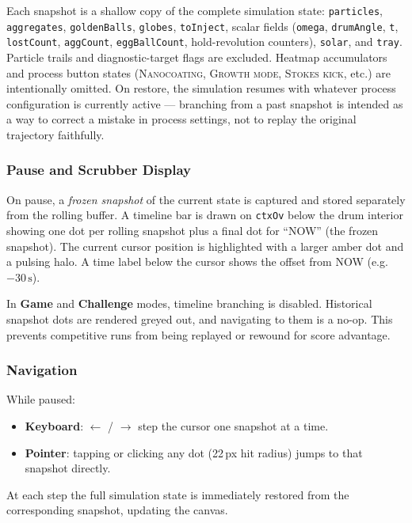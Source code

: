 \documentclass[12pt, a4paper]{article}
\begin{document}
Each snapshot is a shallow copy of the complete simulation state:
\texttt{particles}, \texttt{aggregates}, \texttt{goldenBalls},
\texttt{globes}, \texttt{toInject}, scalar fields (\texttt{omega},
\texttt{drumAngle}, \texttt{t}, \texttt{lostCount}, \texttt{aggCount},
\texttt{eggBallCount}, hold-revolution counters), \texttt{solar}, and
\texttt{tray}. Particle trails and diagnostic-target flags are excluded.
Heatmap accumulators and process button states (\textsc{Nanocoating},
\textsc{Growth mode}, \textsc{Stokes kick}, etc.) are intentionally omitted.
On restore, the simulation resumes with whatever process configuration is
currently active --- branching from a past snapshot is intended as a way to
correct a mistake in process settings, not to replay the original trajectory
faithfully.

\subsubsection{Pause and Scrubber Display}

On pause, a \emph{frozen snapshot} of the current state is captured and stored
separately from the rolling buffer. A timeline bar is drawn on
\texttt{ctxOv} below the drum interior showing one dot per rolling snapshot
plus a final dot for ``NOW'' (the frozen snapshot). The current cursor
position is highlighted with a larger amber dot and a pulsing halo. A time
label below the cursor shows the offset from NOW (e.g.\ $-30\,\mathrm{s}$).

In \textbf{Game} and \textbf{Challenge} modes, timeline branching is
disabled. Historical snapshot dots are rendered greyed out, and navigating to
them is a no-op. This prevents competitive runs from being replayed or
rewound for score advantage.

\subsubsection{Navigation}

While paused:
\begin{itemize}
  \item \textbf{Keyboard}: $\leftarrow$ / $\rightarrow$ step the cursor one
    snapshot at a time.
  \item \textbf{Pointer}: tapping or clicking any dot (22\,px hit radius)
    jumps to that snapshot directly.
\end{itemize}
At each step the full simulation state is immediately restored from the
corresponding snapshot, updating the canvas.
\end{document}
